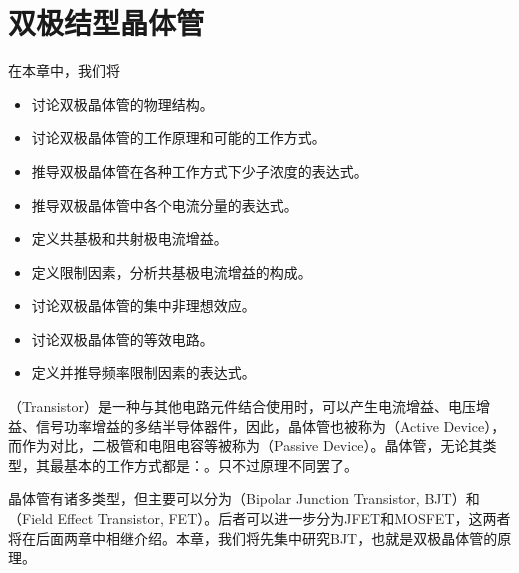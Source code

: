 \chapter{双极结型晶体管}

在本章中，我们将
\begin{itemize}
    \item 讨论双极晶体管的物理结构。
    \item 讨论双极晶体管的工作原理和可能的工作方式。
    \item 推导双极晶体管在各种工作方式下少子浓度的表达式。
    \item 推导双极晶体管中各个电流分量的表达式。
    \item 定义共基极和共射极电流增益。
    \item 定义限制因素，分析共基极电流增益的构成。
    \item 讨论双极晶体管的集中非理想效应。
    \item 讨论双极晶体管的等效电路。
    \item 定义并推导频率限制因素的表达式。
\end{itemize}

（Transistor）是一种与其他电路元件结合使用时，可以产生电流增益、电压增益、信号功率增益的多结半导体器件，因此，晶体管也被称为（Active Device），而作为对比，二极管和电阻电容等被称为（Passive Device）。晶体管，无论其类型，其最基本的工作方式都是：。只不过原理不同罢了。

晶体管有诸多类型，但主要可以分为（Bipolar Junction Transistor, BJT）和（Field Effect Transistor, FET）。后者可以进一步分为JFET和MOSFET，这两者将在后面两章中相继介绍。本章，我们将先集中研究BJT，也就是双极晶体管的原理。

